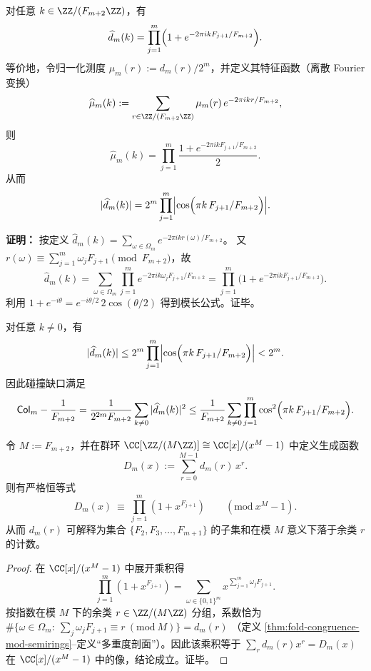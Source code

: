 \begin{theorem}
\label{thm:fold-spectrum-factorization}
对任意 $k\in\ZZ/(F_{m+2}\ZZ)$，有
\[
\widehat d_m(k)=\prod_{j=1}^m\Bigl(1+e^{-2\pi i k F_{j+1}/F_{m+2}}\Bigr).
\]
等价地，令归一化测度 \(\mu_m(r):=d_m(r)/2^m\)，并定义其特征函数（离散 Fourier 变换）
\[
\widehat\mu_m(k):=\sum_{r\in\ZZ/(F_{m+2}\ZZ)}\mu_m(r)\,e^{-2\pi i kr/F_{m+2}},
\]
则
\[
\widehat\mu_m(k)=\prod_{j=1}^m\frac{1+e^{-2\pi i k F_{j+1}/F_{m+2}}}{2}.
\]
从而
\[
|\widehat d_m(k)|=2^m\prod_{j=1}^m\Bigl|\cos\Bigl(\pi k\,F_{j+1}/F_{m+2}\Bigr)\Bigr|.
\]
\end{theorem}

\textbf{证明：}
按定义
\(
\widehat d_m(k)=\sum_{\omega\in\Omega_m}e^{-2\pi i k r(\omega)/F_{m+2}}
\)。
又 \(r(\omega)\equiv \sum_{j=1}^m \omega_j F_{j+1}\pmod{F_{m+2}}\)，故
\[
\widehat d_m(k)=\sum_{\omega\in\Omega_m}\prod_{j=1}^m e^{-2\pi i k\omega_j F_{j+1}/F_{m+2}}
=\prod_{j=1}^m\bigl(1+e^{-2\pi i k F_{j+1}/F_{m+2}}\bigr).
\]
利用 $1+e^{-i\theta}=e^{-i\theta/2}\,2\cos(\theta/2)$ 得到模长公式。证毕。

\begin{corollary}[非平凡频谱的乘性上界]
\label{cor:fold-spectrum-nontrivial-bound}
对任意 $k\ne 0$，有
\[
|\widehat d_m(k)|\le 2^m\prod_{j=1}^m\Bigl|\cos\Bigl(\pi k\,F_{j+1}/F_{m+2}\Bigr)\Bigr|<2^m.
\]
因此碰撞缺口满足
\[
\mathsf{Col}_m-\frac{1}{F_{m+2}}=\frac{1}{2^{2m}F_{m+2}}\sum_{k\ne 0}|\widehat d_m(k)|^2
\le\frac{1}{F_{m+2}}\sum_{k\ne 0}\prod_{j=1}^m\cos^2\Bigl(\pi k\,F_{j+1}/F_{m+2}\Bigr).
\]
\end{corollary}

\begin{proposition}[循环子集和计数与群环生成函数恒等式]\label{prop:fold-multiplicity-group-algebra}
令 \(M:=F_{m+2}\)，并在群环
\(
\CC[\ZZ/(M\ZZ)]\cong \CC[x]/(x^{M}-1)
\)
中定义生成函数
\[
D_m(x):=\sum_{r=0}^{M-1} d_m(r)\,x^r.
\]
则有严格恒等式
\[
\boxed{\;
D_m(x)\ \equiv\ \prod_{j=1}^{m}\left(1+x^{F_{j+1}}\right)\qquad(\mathrm{mod}\ x^{M}-1).\;}
\]
从而 \(d_m(r)\) 可解释为集合 \(\{F_{2},F_{3},\dots,F_{m+1}\}\) 的子集和在模 \(M\) 意义下落于余类 \(r\) 的计数。
\end{proposition}

\begin{proof}
在 \(\CC[x]/(x^{M}-1)\) 中展开乘积得
\[
\prod_{j=1}^{m}\left(1+x^{F_{j+1}}\right)
=\sum_{\omega\in\{0,1\}^m}x^{\sum_{j=1}^m \omega_jF_{j+1}}.
\]
按指数在模 \(M\) 下的余类 \(r\in\ZZ/(M\ZZ)\) 分组，系数恰为
\(
\#\{\omega\in\Omega_m:\ \sum_j \omega_jF_{j+1}\equiv r\ (\mathrm{mod}\ M)\}
=d_m(r)
\)
（定义 \ref{thm:fold-congruence-mod-semirings}--定义“多重度剖面”）。因此该乘积等于 \(\sum_r d_m(r)x^r=D_m(x)\) 在 \(\CC[x]/(x^M-1)\) 中的像，结论成立。证毕。
\end{proof}

